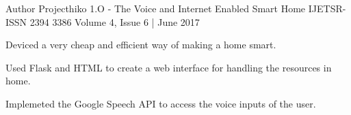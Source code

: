 


\begin{cventries}


\cventry
{Author} %
{Projecthiko 1.O - The Voice and Internet Enabled Smart Home} %
{IJETSR- ISSN 2394 3386 } %
{Volume 4, Issue 6 | June 2017} %
{ %
\begin{cvitems}
\item {Deviced a very cheap and efficient way of making a home smart.}
\item {Used Flask and HTML to create a web interface for handling the resources in home.}
\item {Implemeted the Google Speech API to access the voice inputs of the user.}
\end{cvitems}
}



\end{cventries}